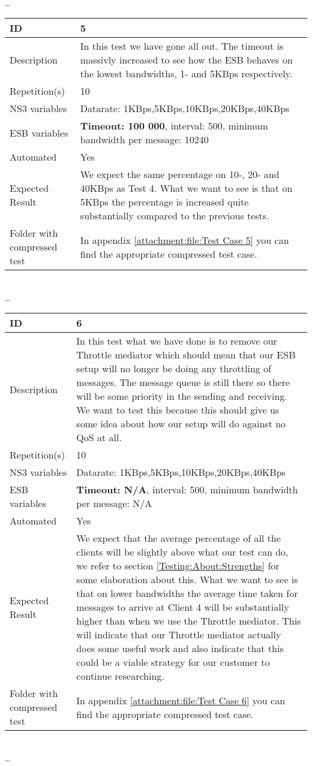 \begin{center}
\\ \ldots \\

\begin{tabular}{| p{4cm} | p{8cm} |}%
	\hline
	ID & 5 \\
	\hline
	Description & In this test we have gone all out. The timeout is massivly increased to see how the ESB behaves on the lowest bandwidths, 1- and 5KBps respectively.  \\
	\hline
	Repetition(s) & 10 \\
	\hline
	NS3 variables & Datarate: 1KBps,5KBps,10KBps,20KBps,40KBps \\
	\hline
	ESB variables & \textbf{Timeout: 100 000}, interval: 500, minimum bandwidth per message: 10240 \\
	\hline
	Automated & Yes \\
	\hline
	Expected Result & We expect the same percentage on 10-, 20- and 40KBps as Test 4. What we want to see is that on 5KBps the percentage is increased quite substantially compared to the previous tests. \\
	\hline
	Folder with compressed test & In appendix \ref{attachment:file:Test Case 5} you can find the appropriate compressed test case.\\
	\hline
\end{tabular}
\\ \ldots \\
\begin{tabular}{| p{4cm} | p{8cm} |}%
	\hline
	ID & 6 \\
	\hline
	Description & In this test what we have done is to remove our Throttle mediator which should mean that our ESB setup will no longer be doing any throttling of messages. The message queue is still there so there will be some priority in the sending and receiving. We want to test this because this should give us some idea about how our setup will do against no QoS at all. \\
	\hline
	Repetition(s) & 10 \\
	\hline
	NS3 variables & Datarate: 1KBps,5KBps,10KBps,20KBps,40KBps \\
	\hline
	ESB variables & \textbf{Timeout: N/A}, interval: 500, minimum bandwidth per message: N/A \\
	\hline
	Automated & Yes \\
	\hline
	Expected Result & We expect that the average percentage of all the clients will be slightly above what our test can do, we refer to section \ref{Testing:About:Strengths} for some elaboration about this. What we want to see is that on lower bandwidths the average time taken for messages to arrive at Client 4 will be substantially higher than when we use the Throttle mediator. This will indicate that our Throttle mediator actually does some useful work and also indicate that this could be a viable strategy for our customer to continue researching. \\
	\hline
	Folder with compressed test & In appendix \ref{attachment:file:Test Case 6} you can find the appropriate compressed test case. \\
	\hline
\end{tabular}

\\ \ldots \\

\end{center}
